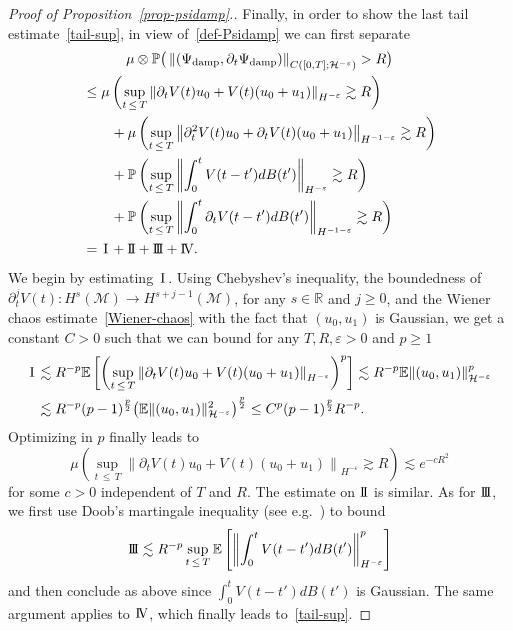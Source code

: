 \documentclass[10pt]{amsart}
\theoremstyle{definition}\newtheorem{defi}[theo]{Definition}\newtheorem{rema}[theo]{Remark}\newtheorem{exam}[theo]{Example}\newtheorem{exem}[theo]{Example}\newtheorem{nota}[theo]{Notation}
\newcommand{\damp}{\textup{damp}}
\newcommand{\I}{\hspace{0.5mm}\text{I}\hspace{0.5mm}}
\newcommand{\II}{\text{I \hspace{-2.8mm} I} }
\newcommand{\III}{\text{I \hspace{-2.9mm} I \hspace{-2.9mm} I}}
\newcommand{\IV}{\text{I \hspace{-2.9mm} V}}
\newcommand{\R}{\mathbb{R}}
\newcommand{\E}{\mathbb{E}}
\newcommand{\Prob}{\mathbb{P}}
\newcommand{\M}{\mathcal{M}}
\renewcommand{\H}{\mathcal{H}}
\newcommand{\eps}{\varepsilon}
\newcommand{\dt}{\partial_t}
\newcommand{\les}{\lesssim}
\begin{document}
\begin{proof}[Proof of Proposition~\ref{prop-psidamp}.]
Finally, in order to show the last tail estimate~\eqref{tail-sup}, in view of~\eqref{def-Psidamp} we can first separate
\begin{multline*}
\mu\otimes\Prob\big(\left\|\left(\Psi_{\damp},\dt\Psi_\damp\right)\right\|_{C\left([0,T];\H^{-\eps}\right)}>R\big)\\
\begin{aligned}
&\le \mu\left(\sup_{t\,\le\,T}\left\|\dt V(t)u_0 + V(t)(u_0+u_1)\right\|_{H^{-\eps}}\gtrsim R\right)\\
&\qquad+\mu\left(\sup_{t\,\le\,T}\left\|\dt^2 V(t)u_0 + \dt V(t)(u_0+u_1)\right\|_{H^{-1-\eps}}\gtrsim R\right)\\
&\qquad+\Prob\left(\sup_{t\,\le\,T}\left\|\int_0^tV(t-t')dB(t')\right\|_{H^{-\eps}}\gtrsim R\right)\\
&\qquad+\Prob\left(\sup_{t\,\le\,T}\left\|\int_0^t\dt V(t-t')dB(t')\right\|_{H^{-1-\eps}}\gtrsim R\right)\\
&= \I+\II+\III+\IV.
\end{aligned}
\end{multline*}
We begin by estimating $\I$. Using Chebyshev's inequality, the boundedness of $\dt^j V(t): H^s(\M)\to H^{s+j-1}(\M)$, for any $s\in\R$ and $j\ge 0$, and the Wiener chaos estimate~\eqref{Wiener-chaos} with the fact that $(u_0,u_1)$ is Gaussian, we get a constant $C>0$ such that we can bound for any $T,R,\eps>0$ and $p\ge 1$
\begin{align*}
\I & \les R^{-p}\E\left[\left(\sup_{t\,\le\,T}\left\|\dt V(t)u_0 + V(t)(u_0+u_1)\right\|_{H^{-\eps}}\right)^p\right] \les R^{-p} \E\|(u_0,u_1)\|_{\H^{-\eps}}^p \\
&\les R^{-p}(p-1)^{\frac{p}2}\big(\E\|(u_0,u_1)\|_{\H^{-\eps}}^2\big)^{\frac{p}2} \le C^p (p-1)^{\frac{p}2}R^{-p}.
\end{align*}
Optimizing in $p$ finally leads to
\begin{equation*}
\mu\left(\sup_{t\,\le\,T}\left\|\dt V(t)u_0 + V(t)(u_0+u_1)\right\|_{H^{-\eps}}\gtrsim R\right) \les e^{-cR^2}
\end{equation*}
for some $c>0$ independent of $T$ and $R$. The estimate on $\II$ is similar. As for $\III$, we first use Doob's martingale inequality (see e.g.~\cite[Theorem~3.9]{DPZ}) to bound
\begin{equation*}
\III \les R^{-p}\sup_{t\,\le\,T}\E\left[\left\|\int_0^tV(t-t')dB(t')\right\|_{H^{-\eps}}^p\right]
\end{equation*}
and then conclude as above since $\int_0^tV(t-t')dB(t')$ is Gaussian. The same argument applies to $\IV$, which finally leads to~\eqref{tail-sup}.
\end{proof}
\end{document}
